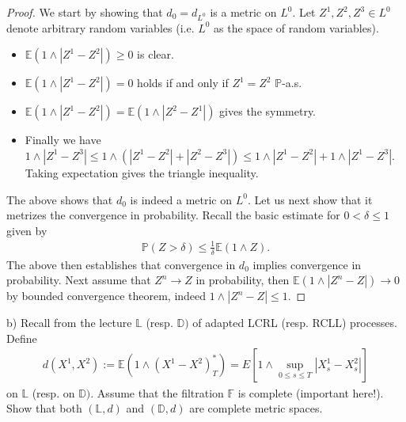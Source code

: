 \documentclass[12pt,a4paper, twoside]{article}
\theoremstyle{definition}
\newcommand{\EE}{\mathbb{E}} %
\newcommand{\PP}{\mathbb{P}} %
\begin{document}
\begin{proof}
We start by showing that $d_0=d_{L^0}$ is a metric on $L^0$. Let $Z^1,Z^2,Z^3 \in L^0$ denote arbitrary random variables (i.e. $L^0$ as the space of random variables).  
\begin{itemize}
\item $\EE(1 \wedge |Z^1-Z^2|) \geq 0$ is clear.
\item $\EE(1 \wedge |Z^1 -Z^2|)=0$ holds if and only if $Z^1 =Z^2$ $\PP$-a.s.
\item $\EE(1 \wedge |Z^1-Z^2 |) = \EE( 1 \wedge |Z^2-Z^1|)$ gives the symmetry.
\item Finally we have $1 \wedge |Z^1-Z^3| \leq 1 \wedge ( |Z^1-Z^2| + |Z^2-Z^3|) \leq 1 \wedge |Z^1-Z^2|+ 1 \wedge |Z^1-Z^3|$. Taking expectation gives the triangle inequality. 
\end{itemize} 
The above shows that $d_0$ is indeed a metric on $L^0$. Let us next show that it metrizes the convergence in probability. Recall the basic estimate for $0 < \delta \leq 1$ given by
\begin{align*}
\PP(Z> \delta) \leq \frac{1}{\delta} \EE(1 \wedge Z).
\end{align*}
The above then establishes that convergence in $d_0$ implies convergence in probability. Next assume that $Z^n \to Z$ in probability, then $\EE(1 \wedge | Z^n -Z|) \to 0$ by bounded convergence theorem, indeed $1 \wedge |Z^n-Z| \leq 1$. 
\end{proof}
\noindent b) Recall from the lecture $\mathbb{L}$ (resp. $\mathbb{D})$ of adapted LCRL (resp. RCLL) processes. Define
\begin{align*}
d(X^1,X^2):= \EE(1 \wedge (X^1-X^2)_T^*) = E \left[ 1 \wedge \sup_{0 \leq s \leq T} |X_s^1-X_s^2| \right]
\end{align*}
on $\mathbb{L}$ (resp. on $\mathbb{D})$. Assume that the filtration $\mathbb{F}$ is complete (important here!). Show that both $( \mathbb{L},d)$ and $( \mathbb{D},d)$ are complete metric spaces. 
\end{document}
